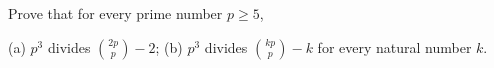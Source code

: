 Prove that for every prime number $p\ge5$,

(a) $p^3$ divides $\binom{2p}p-2$;
(b) $p^3$ divides $\binom{kp}p-k$ for every natural number $k$.